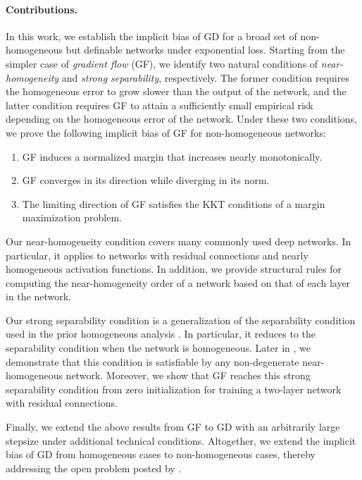 \paragraph{Contributions.} 
In this work, we establish the implicit bias of GD for a broad set of non-homogeneous but definable networks under exponential loss. 
Starting from the simpler case of \emph{gradient flow} (GF), we identify two natural conditions of \emph{near-homogeneity} and \emph{strong separability}, respectively.  
The former condition requires the homogeneous error to grow slower than the output of the network, and the latter condition requires GF to attain a sufficiently small empirical risk depending on the homogeneous error of the network. 
Under these two conditions, we prove the following implicit bias of GF for non-homogeneous networks:
\begin{enumerate}[leftmargin=*]
\item GF induces a normalized margin that increases nearly monotonically. 
\item GF converges in its direction while diverging in its norm. 
\item The limiting direction of GF satisfies the KKT conditions of a margin maximization problem.
\end{enumerate}

Our near-homogeneity condition covers many commonly used deep networks. In particular, it applies to networks with residual connections and nearly homogeneous activation functions. In addition, we provide structural rules for computing the near-homogeneity order of a network based on that of each layer in the network. 

Our strong separability condition is a generalization of the separability condition used in the prior homogeneous analysis \citep{lyu2020gradient,ji2020directional}. In particular, it reduces to the separability condition when the network is homogeneous.
Later in , we demonstrate that this condition is satisfiable by any non-degenerate near-homogeneous network. 
Moreover, we show that GF reaches this strong separability condition from zero initialization for training a two-layer network with residual connections.

Finally, we extend the above results from GF to GD with an arbitrarily large stepsize under additional technical conditions. 
Altogether, we extend the implicit bias of GD from homogeneous cases \citep{lyu2020gradient,ji2020directional} to non-homogeneous cases, thereby addressing the open problem posted by \citet{ji2020directional}.

